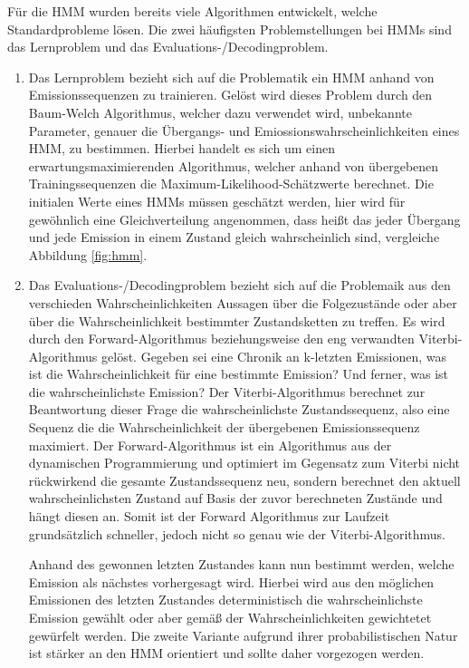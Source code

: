 Für die HMM wurden bereits viele Algorithmen entwickelt, welche Standardprobleme lösen.
Die zwei häufigsten Problemstellungen bei HMMs sind das Lernproblem und das Evaluations-/Decodingproblem.
\begin{enumerate}
	\item Das Lernproblem bezieht sich auf die Problematik ein HMM anhand von Emissionssequenzen zu trainieren. Gelöst wird dieses Problem durch den Baum-Welch Algorithmus, welcher dazu verwendet wird, unbekannte Parameter, genauer die Übergangs- und Emiossionswahrscheinlichkeiten eines HMM, zu bestimmen.
 Hierbei handelt es sich um einen erwartungsmaximierenden Algorithmus, welcher anhand von übergebenen Trainingssequenzen die Maximum-Likelihood-Schätzwerte berechnet.
 Die initialen Werte eines HMMs müssen geschätzt werden, hier wird für gewöhnlich eine Gleichverteilung angenommen, dass heißt das jeder Übergang und jede Emission in einem Zustand gleich wahrscheinlich sind, vergleiche Abbildung \ref{fig:hmm}.
	\item Das Evaluations-/Decodingproblem bezieht sich auf die Problemaik aus den verschieden Wahrscheinlichkeiten Aussagen über die Folgezustände oder aber über die Wahrscheinlichkeit bestimmter Zustandsketten zu treffen.
Es wird durch den Forward-Algorithmus beziehungsweise den eng verwandten Viterbi-Algorithmus gelöst.
Gegeben sei eine Chronik an k-letzten Emissionen, was ist die Wahrscheinlichkeit für eine bestimmte Emission? Und ferner, was ist die wahrscheinlichste Emission? Der Viterbi-Algorithmus berechnet zur Beantwortung dieser Frage die wahrscheinlichste Zustandssequenz, also eine Sequenz die die Wahrscheinlichkeit der übergebenen Emissionssequenz maximiert.
Der Forward-Algorithmus ist ein Algorithmus aus der dynamischen Programmierung und optimiert im Gegensatz zum Viterbi nicht rückwirkend die gesamte Zustandssequenz neu, sondern berechnet den aktuell wahrscheinlichsten Zustand auf Basis der zuvor berechneten Zustände und hängt diesen an.
Somit ist der Forward Algorithmus zur Laufzeit grundsätzlich schneller, jedoch nicht so genau wie der Viterbi-Algorithmus.

Anhand des gewonnen letzten Zustandes kann nun bestimmt werden, welche Emission als nächstes vorhergesagt wird. Hierbei wird aus den möglichen Emissionen des letzten Zustandes deterministisch die wahrscheinlichste Emission gewählt oder aber gemäß der Wahrscheinlichkeiten gewichtetet gewürfelt werden. Die zweite Variante aufgrund ihrer probabilistischen Natur ist stärker an den HMM orientiert und sollte daher vorgezogen werden.
 \end{enumerate}


